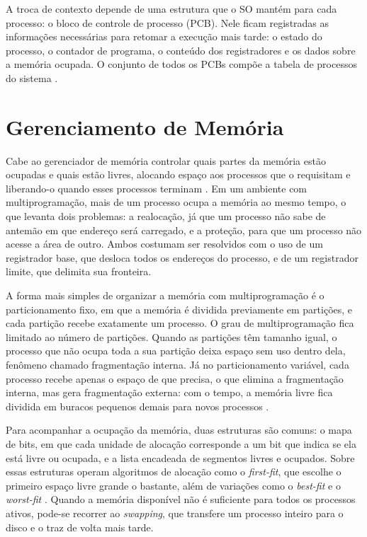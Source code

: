 \documentclass[
	12pt,				%
	openright,			%
	a4paper,			%
	english,			%
	french,				%
	spanish,			%
	brazilian,				%
	]{abntex2}
\begin{document}
A troca de contexto depende de uma estrutura que o SO mantém para cada processo:
o bloco de controle de processo (PCB). Nele ficam registradas as informações
necessárias para retomar a execução mais tarde: o estado do processo, o contador
de programa, o conteúdo dos registradores e os dados sobre a memória ocupada. O
conjunto de todos os PCBs compõe a tabela de processos do sistema
\cite{silberschatz2015}.

\section{Gerenciamento de Memória}
Cabe ao gerenciador de memória controlar quais partes da memória estão ocupadas e
quais estão livres, alocando espaço aos processos que o requisitam e liberando-o quando
esses processos terminam \cite{tanenbaum2016}. Em um ambiente com multiprogramação, mais
de um processo ocupa a memória ao mesmo tempo, o que levanta dois problemas: a
realocação, já que um processo não sabe de antemão em que endereço será carregado, e a
proteção, para que um processo não acesse a área de outro. Ambos costumam ser resolvidos
com o uso de um registrador base, que desloca todos os endereços do processo, e de um
registrador limite, que delimita sua fronteira.

A forma mais simples de organizar a memória com multiprogramação é o particionamento
fixo, em que a memória é dividida previamente em partições, e cada partição recebe
exatamente um processo. O grau de multiprogramação fica limitado ao número de
partições. Quando as partições têm tamanho igual, o processo que não ocupa toda a
sua partição deixa espaço sem uso dentro dela, fenômeno chamado fragmentação interna.
Já no particionamento variável, cada processo recebe apenas o espaço de que precisa,
o que elimina a fragmentação interna, mas gera fragmentação externa: com o tempo,
a memória livre fica dividida em buracos pequenos demais para novos processos
\cite{silberschatz2015}.

Para acompanhar a ocupação da memória, duas estruturas são comuns: o mapa de bits,
em que cada unidade de alocação corresponde a um bit que indica se ela está livre ou
ocupada, e a lista encadeada de segmentos livres e ocupados. Sobre essas estruturas
operam algoritmos de alocação como o \emph{first-fit}, que escolhe o primeiro espaço livre
grande o bastante, além de variações como o \emph{best-fit} e o \emph{worst-fit}
\cite{silberschatz2015}. Quando a memória disponível não é suficiente para todos os
processos ativos, pode-se recorrer ao \emph{swapping}, que transfere um processo inteiro
para o disco e o traz de volta mais tarde.
\end{document}

